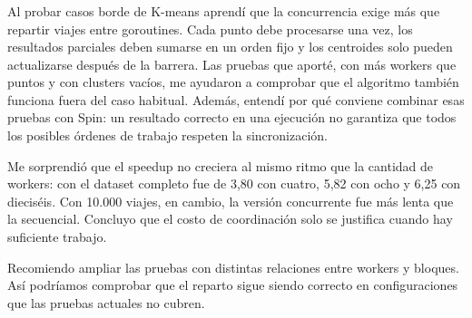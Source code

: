 \subsubsection*{\nombreTercero}
Al probar casos borde de K-means aprendí que la concurrencia exige más que repartir viajes entre
goroutines. Cada punto debe procesarse una vez, los resultados parciales deben sumarse en un orden
fijo y los centroides solo pueden actualizarse después de la barrera. Las pruebas que aporté, con
más workers que puntos y con clusters vacíos, me ayudaron a comprobar que el algoritmo también
funciona fuera del caso habitual. Además, entendí por qué conviene combinar esas pruebas con Spin:
un resultado correcto en una ejecución no garantiza que todos los posibles órdenes de trabajo
respeten la sincronización.

Me sorprendió que el speedup no creciera al mismo ritmo que la cantidad de workers: con el dataset
completo fue de 3,80 con cuatro, 5,82 con ocho y 6,25 con dieciséis. Con 10.000 viajes, en cambio,
la versión concurrente fue más lenta que la secuencial. Concluyo que el costo de coordinación solo
se justifica cuando hay suficiente trabajo.

Recomiendo ampliar las pruebas con distintas relaciones entre workers y bloques. Así podríamos comprobar que el reparto sigue siendo correcto en
configuraciones que las pruebas actuales no cubren.
